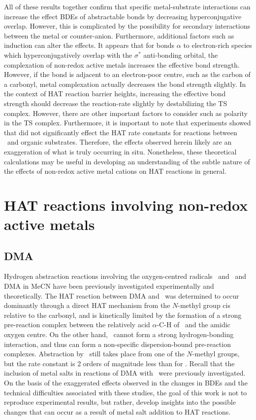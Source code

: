 All of these results together confirm that specific metal-substrate
interactions can increase the effect BDEs of abstractable  bonds by
decreasing hyperconjugative overlap. However, this is complicated by the
possibility for secondary interactions between the metal or counter-anion.
Furthermore, additional factors such as induction can alter the effects. It
appears that for  bonds $\alpha$ to electron-rich species which
hyperconjugatively overlap with the $\sigma^*$ anti-bonding orbital, the
complexation of non-redox active metals increases the effective  bond
strength. However, if the  bond is adjacent to an electron-poor centre,
such as the carbon of a carbonyl, metal complexation actually decreases the
bond strength slightly. In the context of HAT reaction barrier heights,
increasing the effective  bond strength should decrease the
reaction-rate slightly by destabilizing the TS complex. However, there are
other important factors to consider such as polarity in the TS complex.
Furthermore, it is important to note that experiments showed that 
did not significantly effect the HAT rate constants for reactions between
\cumo\ and organic substrates. Therefore, the effects observed herein likely
are an exaggeration of what is truly occurring in situ. Nonetheless, these
theoretical calculations may be useful in developing an understanding of the
subtle nature of the effects of non-redox active metal cations on HAT reactions
in general.

\section{HAT reactions involving non-redox active metals}

\subsection{DMA}

Hydrogen abstraction reactions involving the oxygen-centred radicals \bno\ and
\cumo\ and DMA in MeCN have been previously investigated experimentally and
theoretically.\cite{Salamone2013} The HAT reaction between DMA and \bno\ was
determined to occur dominantly through a direct HAT mechanism from the
$N$-methyl group cis relative to the carbonyl, and is kinetically limited by
the formation of a strong pre-reaction complex between the relatively acid
$\alpha$-C-H of \bno\ and the amidic oxygen centre. On the other hand, \cumo\
cannot form a strong hydrogen-bonding interaction, and thus can form a
non-specific dispersion-bound pre-reaction complexes. Abstraction by \cumo\
still takes place from one of the $N$-methyl groups, but the rate constant is 2
orders of magnitude less than for \bno. Recall that the inclusion of metal
salts in reactions of DMA with \cumo\ were previously
investigated.\cite{Salamone2015metals} On the basis of the exaggerated effects
observed in the changes in BDEs and the technical difficulties associated with
these studies, the goal of this work is not to reproduce experimental results,
but rather, develop insights into the possible changes that can occur as a
result of metal salt addition to HAT reactions.

